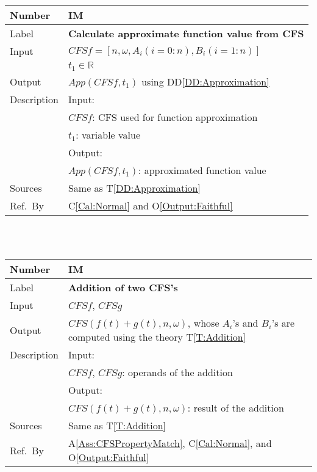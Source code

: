 \documentclass[12pt]{article}
\newcommand{\colAwidth}{0.13\textwidth}
\newcommand{\colBwidth}{0.82\textwidth}
\newcommand{\ddref}[1]{DD\ref{#1}}
\newcommand{\tref}[1]{T\ref{#1}}
\newcounter{instnum} %
\newcommand{\aref}[1]{A\ref{#1}}
\newcommand{\calref}[1]{C\ref{#1}}
\newcommand{\oref}[1]{O\ref{#1}}
\begin{document}
\noindent
\begin{minipage}{\textwidth}
	\renewcommand*{\arraystretch}{1.5}
	\begin{tabular}{| p{\colAwidth} | p{\colBwidth}|}
		\hline
		\rowcolor[gray]{0.9}
		Number& IM{instnum}\theinstnum 
		\label{IM:Approximation}\\
		\hline
		Label& \bf Calculate approximate function value from CFS\\
		\hline
		Input& $\mathit{CFSf}=[n, \omega, A_i(i=0:n), B_i(i=1:n)]$\\
		&$t_1\in\mathbb{R}$\\
		\hline
		Output& $\mathit{App}(\mathit{CFSf}, t_1)$ using \ddref{DD:Approximation}\\
		\hline
		Description&Input:\\
		&$CFSf$: CFS used for function approximation\\
		& $t_1$: variable value\\
		&Output:\\
		&$\mathit{App}(\mathit{CFSf}, t_1)$: approximated function value\\ 
		\hline
		Sources&Same as \tref{DD:Approximation}		\\
		\hline
		Ref.\ By & 
		\calref{Cal:Normal} and
		\oref{Output:Faithful}\\
		\hline
	\end{tabular}
\end{minipage}\\
~\newline


\noindent
\begin{minipage}{\textwidth}
	\renewcommand*{\arraystretch}{1.5}
	\begin{tabular}{| p{\colAwidth} | p{\colBwidth}|}
		\hline
		\rowcolor[gray]{0.9}
		Number& IM{instnum}\theinstnum 
		\label{IM:Addition}\\
		\hline
		Label& \bf Addition of two CFS's \\
		\hline
		Input& $\mathit{CFSf}$, $\mathit{CFSg}$\\
		\hline
		Output& $\mathit{CFS}(f(t)+g(t), n, \omega)$, whose $A_i$'s 
		and $B_i$'s are computed using the theory \tref{T:Addition}\\
		\hline
		Description&Input:\\
		&$\mathit{CFSf}$, $\mathit{CFSg}$: operands of the addition\\
		&Output:\\
		& $\mathit{CFS}(f(t)+g(t), n, \omega)$: result of the addition\\
		\hline
		Sources&Same as \tref{T:Addition}		\\
		\hline
		Ref.\ By & \aref{Ass:CFSPropertyMatch}, \calref{Cal:Normal}, 
		and \oref{Output:Faithful}\\
		\hline
	\end{tabular}
\end{minipage}\\
~\newline
\end{document}
